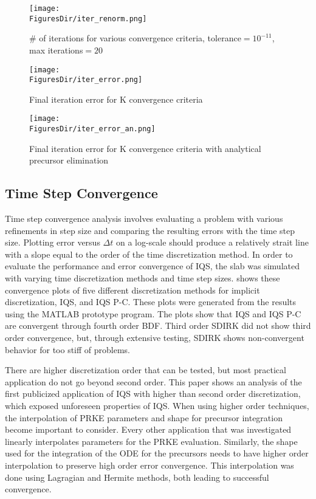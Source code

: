 \begin{figure}[!htbp]
\centering
\texttt{[image: \\FiguresDir/iter\_renorm.png]}
\caption{\# of iterations for various convergence criteria, tolerance$=10^{-11}$, max iterations$=20$}
\label{fig:iter}
\end{figure}

\begin{figure}[!htbp]
\centering
\texttt{[image: \\FiguresDir/iter\_error.png]}
\caption{Final iteration error for K convergence criteria}
\label{fig:iter_err}
\end{figure}

\begin{figure}[!htbp]
\centering
\texttt{[image: \\FiguresDir/iter\_error\_an.png]}
\caption{Final iteration error for K convergence criteria with analytical precursor elimination}
\label{fig:iter_err_an}
\end{figure}


\subsection{Time Step Convergence}

Time step convergence analysis involves evaluating a problem with various refinements in step size and comparing the resulting errors with the time step size. Plotting error versus $\Delta t$ on a log-scale should produce a relatively strait line with a slope equal to the order of the time discretization method. In order to evaluate the performance and error convergence of IQS, the slab was simulated with varying time discretization methods and time step sizes.   shows these convergence plots of five different discretization methods for implicit discretization, IQS, and IQS P-C.  These plots were generated from the results using the MATLAB prototype program.  The plots show that IQS and IQS P-C are convergent through fourth order BDF.  Third order SDIRK did not show third order convergence, but, through extensive testing, SDIRK shows non-convergent behavior for too stiff of problems.  

There are higher discretization order that can be tested, but most practical application do not go beyond second order.  This paper shows an analysis of the first publicized application of IQS with higher than second order discretization, which exposed unforeseen properties of IQS.  When using higher order techniques, the interpolation of PRKE parameters and shape for precursor integration become important to consider.  Every other application that was investigated linearly interpolates parameters for the PRKE evaluation.  Similarly, the shape used for the integration of the ODE for the precursors needs to have higher order interpolation to preserve high order error convergence.  This interpolation was done using Lagragian and Hermite methods, both leading to successful convergence.

